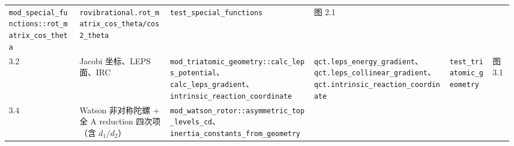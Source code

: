 \documentclass[
]{ctexbook}
\begin{document}
\begin{longtable}[]{@{}llllll@{}}
\begin{minipage}[t]{0.14\columnwidth}
\texttt{mod\_special\_functions::rot\_matrix\_cos\_theta}\strut
\end{minipage} & \begin{minipage}[t]{0.14\columnwidth}\raggedright
\texttt{rovibrational.rot\_matrix\_cos\_theta/cos2\_theta}\strut
\end{minipage} & \begin{minipage}[t]{0.14\columnwidth}\raggedright
\texttt{test\_special\_functions}\strut
\end{minipage} & \begin{minipage}[t]{0.14\columnwidth}\raggedright
图 2.1\strut
\end{minipage}\tabularnewline
\begin{minipage}[t]{0.14\columnwidth}\raggedright
3.2\strut
\end{minipage} & \begin{minipage}[t]{0.14\columnwidth}\raggedright
Jacobi 坐标、LEPS 面、IRC\strut
\end{minipage} & \begin{minipage}[t]{0.14\columnwidth}\raggedright
\texttt{mod\_triatomic\_geometry::calc\_leps\_potential}、\texttt{calc\_leps\_gradient}、\texttt{intrinsic\_reaction\_coordinate}\strut
\end{minipage} & \begin{minipage}[t]{0.14\columnwidth}\raggedright
\texttt{qct.leps\_energy\_gradient}、\texttt{qct.leps\_collinear\_gradient}、\texttt{qct.intrinsic\_reaction\_coordinate}\strut
\end{minipage} & \begin{minipage}[t]{0.14\columnwidth}\raggedright
\texttt{test\_triatomic\_geometry}\strut
\end{minipage} & \begin{minipage}[t]{0.14\columnwidth}\raggedright
图 3.1\strut
\end{minipage}\tabularnewline
\begin{minipage}[t]{0.14\columnwidth}\raggedright
3.4\strut
\end{minipage} & \begin{minipage}[t]{0.14\columnwidth}\raggedright
Watson 非对称陀螺 + 全 A reduction 四次项（含 \(d_1/d_2\)）\strut
\end{minipage} & \begin{minipage}[t]{0.14\columnwidth}\raggedright
\texttt{mod\_watson\_rotor::asymmetric\_top\_levels\_cd}、\texttt{inertia\_constants\_from\_geometry}\strut
\end{minipage} & \begin{minipage}[t]{0.14\columnwidth}\raggedright

\end{minipage}
\end{longtable}
\end{document}
